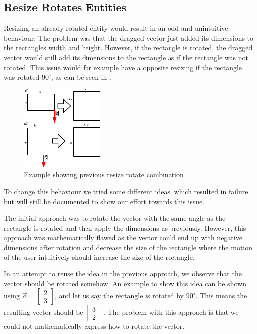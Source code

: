 \subsection{Resize Rotates Entities}
Resizing an already rotated entity would result in an odd and unintuitive behaviour.
The problem was that the dragged vector just added its dimensions to the rectangles width and height.
However, if the rectangle is rotated, the dragged vector would still add its dimensions to the rectangle as if the rectangle was not rotated.
This issue would for example have a opposite resizing if the rectangle was rotated $90^\circ$, as can be seen in .
\begin{figure}[h]
	\centering
	\includegraphics[scale=3]{media/sprint3/How-Rotate+Resize-Worked}
	\caption{Example showing previous resize rotate combination}
	\label{fig:resizeRotate}
\end{figure}
To change this behaviour we tried some different ideas, which resulted in failure but will still be documented to show our effort towards this issue. 

The initial approach was to rotate the vector with the same angle as the rectangle is rotated and then apply the dimensions as previously.
However, this approach was mathematically flawed as the vector could end up with negative dimensions after rotation and decrease the size of the rectangle where the motion of the user intuitively should increase the size of the rectangle.

In an attempt to reuse the idea in the previous approach, we observe that the vector should be rotated somehow.
An example to show this idea can be shown using $\vec{a} =
\begin{bmatrix}
2 \\ 3
\end{bmatrix}$, and let us say the rectangle is rotated by $90^\circ$.
This means the resulting vector should be 
$\begin{bmatrix}
3 \\ 2
\end{bmatrix}$.
The problem with this approach is that we could not mathematically express how to rotate the vector.

